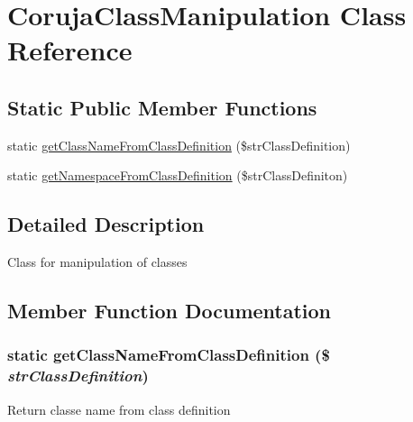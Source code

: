 \hypertarget{class_coruja_class_manipulation}{
\section{CorujaClassManipulation Class Reference}
\label{class_coruja_class_manipulation}
}
\subsection*{Static Public Member Functions}
\begin{CompactItemize}
\item 
static \hyperlink{class_coruja_class_manipulation_23c359d165b1c05df05d804b29f5abec}{getClassNameFromClassDefinition} (\$strClassDefinition)
\item 
static \hyperlink{class_coruja_class_manipulation_51aa4116399c4188565dcdc16a1d71b6}{getNamespaceFromClassDefinition} (\$strClassDefiniton)
\end{CompactItemize}


\subsection{Detailed Description}
Class for manipulation of classes 

\subsection{Member Function Documentation}
\hypertarget{class_coruja_class_manipulation_23c359d165b1c05df05d804b29f5abec}{
\subsubsection[{getClassNameFromClassDefinition}]{\setlength{\rightskip}{0pt plus 5cm}static getClassNameFromClassDefinition (\$ {\em strClassDefinition})}}
\label{class_coruja_class_manipulation_23c359d165b1c05df05d804b29f5abec}


Return classe name from class definition

